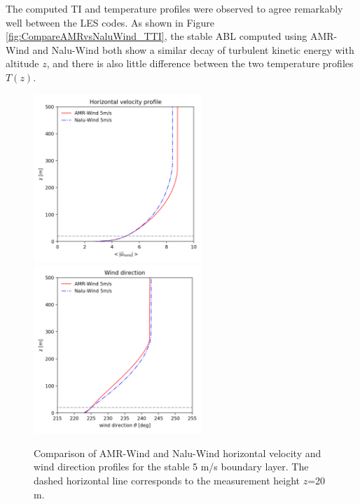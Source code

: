 The computed TI and temperature profiles were observed to agree
remarkably well between the LES codes. As shown in Figure
\ref{fig:CompareAMRvsNaluWind_TTI}, the stable ABL computed using
AMR-Wind and Nalu-Wind both show a similar decay of turbulent kinetic
energy with altitude $z$, and there is also little difference between
the two temperature profiles $T(z)$.

\begin{figure} %
  \centering
  \includegraphics[width=2.5in]{figures/Compare_AMRWind_NaluWind/AMRWind_NaluWind_stable_05ms_mesh2p5_2p5_2p5_WS.png}
  \includegraphics[width=2.5in]{figures/Compare_AMRWind_NaluWind/AMRWind_NaluWind_stable_05ms_mesh2p5_2p5_2p5_Wdir.png}\\
  \caption{\label{fig:CompareAMRvsNaluWind_WSDir} Comparison of
    AMR-Wind and Nalu-Wind horizontal velocity and wind direction
    profiles for the stable 5 m/s boundary layer. The dashed
    horizontal line corresponds to the measurement height $z$=20 m. }
\end{figure}

